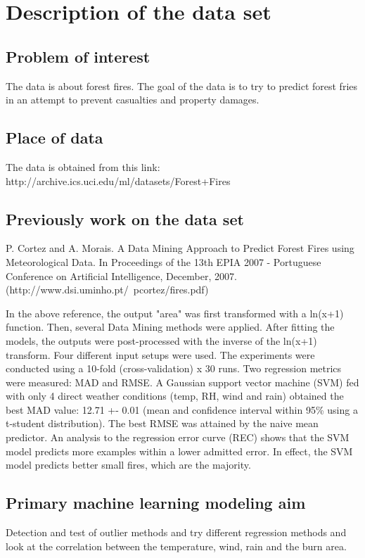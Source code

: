 \section{Description of the data set}

\subsection*{Problem of interest}
The data is about forest fires. The goal of the data is to try to predict forest fries in an attempt to prevent casualties and property damages.

\subsection*{Place of data}
The data is obtained from this link: http://archive.ics.uci.edu/ml/datasets/Forest+Fires

\subsection*{Previously work on the data set}
P. Cortez and A. Morais. A Data Mining Approach to Predict Forest Fires using Meteorological Data.
In Proceedings of the 13th EPIA 2007 - Portuguese Conference on Artificial Intelligence, 
December, 2007. (http://www.dsi.uminho.pt/~pcortez/fires.pdf) \newline

In the above reference, the output "area" was first transformed with a ln(x+1) function.
Then, several Data Mining methods were applied. After fitting the models, the outputs were
post-processed with the inverse of the ln(x+1) transform. Four different input setups were
used. The experiments were conducted using a 10-fold (cross-validation) x 30 runs. Two
regression metrics were measured: MAD and RMSE. A Gaussian support vector machine (SVM) fed
with only 4 direct weather conditions (temp, RH, wind and rain) obtained the best MAD value:
12.71 +- 0.01 (mean and confidence interval within 95\% using a t-student distribution). The
best RMSE was attained by the naive mean predictor. An analysis to the regression error curve
(REC) shows that the SVM model predicts more examples within a lower admitted error. In effect,
the SVM model predicts better small fires, which are the majority.

\subsection*{Primary machine learning modeling aim}
Detection and test of outlier methods and try different regression methods and look at the correlation between the temperature, wind, rain and the burn area. 
